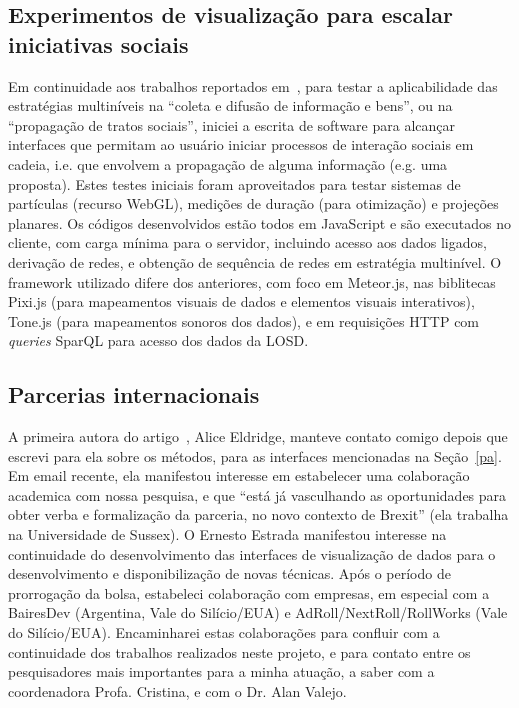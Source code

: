 \documentclass[a4paper, 11pt]{article}
\begin{document}
\subsection{Experimentos de visualização para escalar iniciativas sociais}
Em continuidade aos trabalhos reportados em~\cite{tese,virus,sfvideo},
para testar a aplicabilidade das estratégias multiníveis na ``coleta e difusão de informação e bens'',
ou na ``propagação de tratos sociais'', iniciei a escrita de software para alcançar interfaces
que permitam ao usuário iniciar processos de interação sociais em cadeia, i.e. que envolvem
a propagação de alguma informação (e.g. uma proposta).
Estes testes iniciais foram aproveitados para testar sistemas de partículas (recurso WebGL),
medições de duração (para otimização) e projeções planares.
Os códigos desenvolvidos estão todos em JavaScript e são executados no cliente,
com carga mínima para o servidor,
incluindo acesso aos dados ligados, derivação de redes, e obtenção de sequência de redes
em estratégia multinível.
O framework utilizado difere dos anteriores, com foco em Meteor.js,
nas biblitecas Pixi.js (para mapeamentos visuais de dados e elementos visuais interativos),
Tone.js (para mapeamentos sonoros dos dados),
e em requisições HTTP com \emph{queries} SparQL para acesso dos dados da LOSD.

\subsection{Parcerias internacionais}
A primeira autora do artigo~\cite{eld}, Alice Eldridge,
manteve contato comigo depois que escrevi para ela sobre
os métodos, para as interfaces mencionadas na Seção~\ref{pa}.
Em email recente, ela manifestou interesse em
estabelecer uma colaboração academica com nossa pesquisa, e que ``está já
vasculhando as oportunidades para obter verba e formalização da parceria,
no novo contexto de Brexit'' (ela trabalha na Universidade de Sussex).
O Ernesto Estrada manifestou interesse na continuidade do desenvolvimento
das interfaces de visualização de dados para o desenvolvimento e disponibilização
de novas técnicas.
Após o período de prorrogação da bolsa, estabeleci colaboração
com empresas, em especial com a BairesDev (Argentina, Vale do Silício/EUA) e
AdRoll/NextRoll/RollWorks (Vale do Silício/EUA). 
Encaminharei estas colaborações para confluir com a continuidade dos
trabalhos realizados neste projeto, e para contato entre os pesquisadores
mais importantes para a minha atuação, a saber com a coordenadora Profa. Cristina,
e com o Dr. Alan Valejo.
\end{document}

